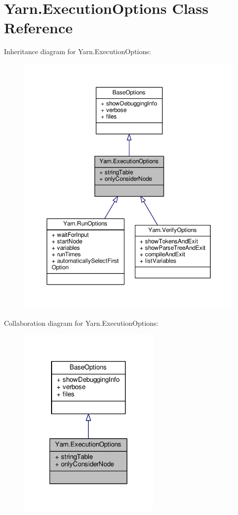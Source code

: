\hypertarget{a00099}{\section{Yarn.\-Execution\-Options Class Reference}
\label{a00099}
}


Inheritance diagram for Yarn.\-Execution\-Options\-:
\nopagebreak
\begin{figure}[H]
\begin{center}
\leavevmode
\includegraphics[width=350pt]{a00645}
\end{center}
\end{figure}


Collaboration diagram for Yarn.\-Execution\-Options\-:
\nopagebreak
\begin{figure}[H]
\begin{center}
\leavevmode
\includegraphics[width=196pt]{a00646}
\end{center}
\end{figure}
